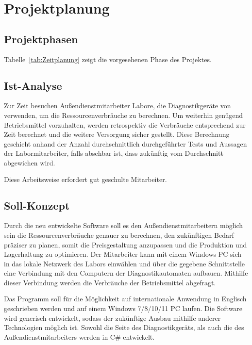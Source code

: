 \section{Projektplanung}
\label{sec:Projektplanung}

\subsection{Projektphasen} 
\label{sec:Projektphasen}

Tabelle~\ref{tab:Zeitplanung} zeigt die vorgesehenen Phase des Projektes.
\\ 

\subsection{Ist-Analyse} 
\label{sec:IstAnalyse}
Zur Zeit besuchen Außendienstmitarbeiter Labore, die Diagnostikgeräte von {\betriebNameKzf} verwenden, um die Ressourcenverbräuche zu berechnen. Um weiterhin genügend Betriebsmittel vorzuhalten, werden retrospektiv die Verbräuche entsprechend zur Zeit berechnet und die weitere Versorgung sicher gestellt. Diese Berechnung geschieht anhand der Anzahl durchschnittlich durchgeführter Tests und Aussagen der Labormitarbeiter, falls absehbar ist, dass zukünftig vom Durchschnitt abgewichen wird.

Diese Arbeitsweise erfordert gut geschulte Mitarbeiter.

\subsection{Soll-Konzept}
\label{sec:SollKonzept}
Durch die neu entwickelte Software soll es den Außendienstmitarbeitern möglich sein die Ressourcenverbräuche genauer zu berechnen, den zukünftigen Bedarf präziser zu planen, somit die Preisgestaltung anzupassen und die Produktion und Lagerhaltung zu optimieren. Der Mitarbeiter kann mit einem Windows PC sich in das lokale Netzwerk des Labors einwählen und über die gegebene Schnittstelle eine Verbindung mit den Computern der Diagnostikautomaten aufbauen. Mithilfe dieser Verbindung werden die Verbräuche der Betriebsmittel abgefragt.

Das Programm soll für die Möglichkeit auf internationale Anwendung in Englisch geschrieben werden und auf einem Windows 7/8/10/11 PC laufen. Die Software wird generisch entwickelt, sodass der zukünftige Ausbau mithilfe anderer Technologien möglich ist. Sowohl die Seite des Diagnostikgeräts, als auch die des Außendienstmitarbeiters werden in C\# entwickelt.

